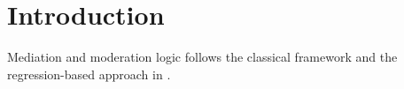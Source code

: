 \section{Introduction}

Mediation and moderation logic follows the classical framework
\citep{baron1986} and the regression-based approach in \citet{hayes2017}.
